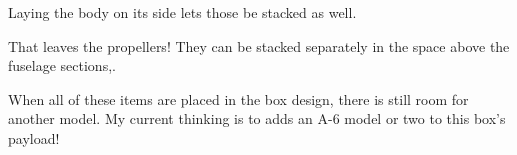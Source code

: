 Laying the body on its side lets those be stacked as well.

That leaves the propellers! They can be stacked separately in the space above
the fuselage sections,.

When all of these items are placed in the box design, there is still room for
another model. My current thinking is to adds an A-6 model or two to this box's
payload!

